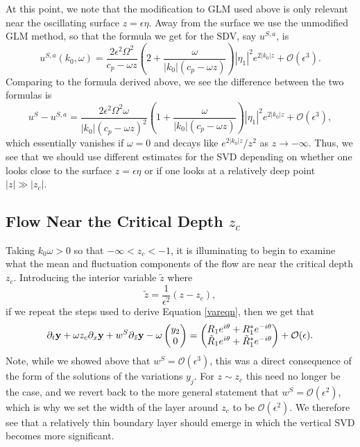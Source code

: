 \documentclass{JFM_Style/jfm}
\newcommand{\bp}{\begin{pmatrix}}
\newcommand{\ep}{\end{pmatrix}}
\newcommand{\pd}{\partial}
\begin{document}
At this point, we note that the modification to GLM used above is only relevant near the oscillating surface $z=\epsilon \eta$.  Away from the surface we use the unmodified GLM method, so that the formula we get for the SDV, say $u^{S,a}$, is 
\[
u^{S,a}(k_{0},\omega) =  \frac{2\epsilon^{2} \Omega^{2}}{c_{p}-\omega z} \left( 2 +  \frac{\omega}{|k_{0}|(c_{p} - \omega z )} \right)\left|\eta_{1}\right|^{2} e^{2|k_{0}|z} + \mathcal{O}(\epsilon^{3}). 
\]
Comparing to the formula derived above, we see the difference between the two formulas is 
\[
u^{S} - u^{S,a} =  \frac{2\epsilon^{2} \Omega^{2}\omega}{|k_{0}|\left(c_{p}-\omega z\right)^{2}}\left(1 + \frac{\omega}{|k_{0}|\left(c_{p}-\omega z\right)}\right) \left|\eta_{1}\right|^{2} e^{2|k_{0}|z} + \mathcal{O}(\epsilon^{3}),
\]
which essentially vanishes if $\omega=0$ and decays like $e^{2|k_{0}|z}/z^{2}$ as $z\rightarrow -\infty$.  Thus, we see that we should use different estimates for the SVD depending on whether one looks close to the surface $z=\epsilon \eta$ or if one looks at a relatively deep point $|z|\gg |z_{c}|$. 


\subsection{Flow Near the Critical Depth $z_{c}$}
Taking $k_{0}\omega >0$ so that $-\infty<z_{c}<-1$, it is illuminating to begin to examine what the mean and fluctuation components of the flow are near the critical depth $z_{c}$.  Introducing the interior variable $\tilde{z}$ where
$$
\tilde{z} = \frac{1}{\epsilon^{2}}\left(z - z_{c} \right), 
$$
if we repeat the steps used to derive Equation \eqref{vareqn}, then we get that
\begin{equation}
\pd_{t}{\bf y} + \omega z_{c} \pd_{x}{\bf y}  + w^{S}\pd_{\tilde{z}}{\bf y} - \omega \bp y_{2}\\ 0 \ep = \bp R_{1}e^{i\theta}+R^{\ast}_{1}e^{-i\theta}\\ \tilde{R}_{1}e^{i\theta}+\tilde{R}^{\ast}_{1}e^{-i\theta} \ep + \mathcal{O}(\epsilon).
\label{modvareqn}
\end{equation}
 Note, while we showed above that $w^{S}=\mathcal{O}(\epsilon^{3})$, this was a direct consequence of the form of the solutions of the variations $y_{j}$.  For $z\sim z_{c}$ this need no longer be the case, and we revert back to the more general statement that  $w^{S}=\mathcal{O}(\epsilon^{2})$, which is why we set the width of the layer around $z_{c}$ to be $\mathcal{O}(\epsilon^{2})$.  We therefore see that a relatively thin boundary layer should emerge in which the vertical SVD becomes more significant.  
 
\end{document}
